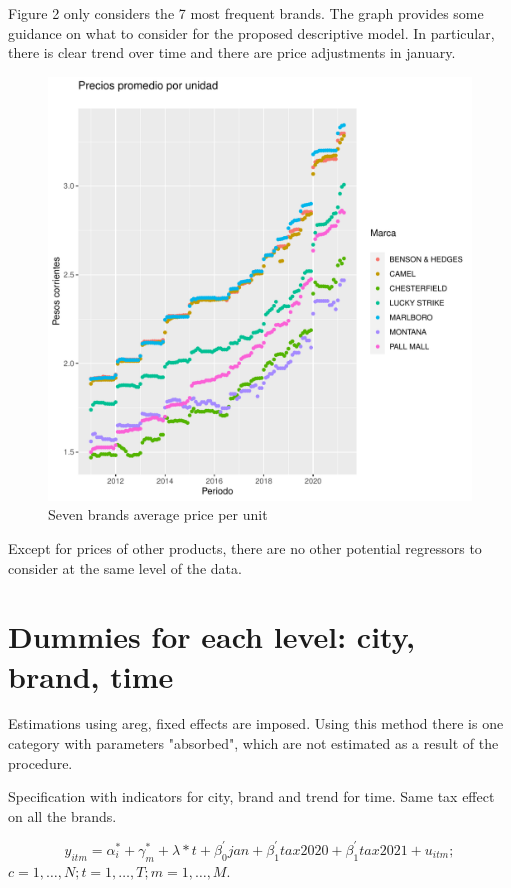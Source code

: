 \documentclass[]{article}
\begin{document}
Figure 2 only considers the 7 most frequent brands. The graph provides some guidance on what to consider for the proposed descriptive model.  In particular, there is clear trend over time and there are price adjustments in january. 

\begin{figure}
\begin{center}
		\includegraphics[width=\textwidth]{prin7_prom_ppu_marcas.pdf} 
\end{center}
 \caption{Seven brands average price per unit}
\end{figure}


Except for prices of other products, there are no other potential regressors to consider at the same level of the data.

\section{Dummies for each level: city, brand, time}
Estimations using areg, fixed effects are imposed. Using  this method there is one category with parameters "absorbed", which are not estimated as a result of the procedure.

Specification with indicators for city, brand and trend for time.
Same tax effect on all the brands.

\begin{equation*} 
y_{itm}  = \alpha_{i}^{*} + \gamma_{m}^{*} + \lambda*t + \beta_{0}^{'}jan + \beta_{1}^{'}tax2020 + \beta_{1}^{'}tax2021 + u_{itm}
;   \tag{2.1}
\end{equation*}
$c  = 1,\ldots,N;  t=1,\ldots,T; m=1,\ldots,M. $
\end{document}
